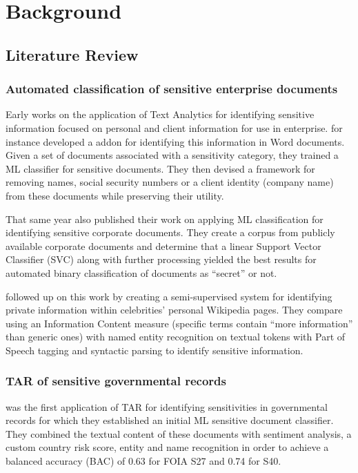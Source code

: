 \documentclass[\version]{l4proj}
\begin{document}
\chapter{Background}

\section{Literature Review}\label{section:lit_review}

\subsection{Automated classification of sensitive enterprise documents}

Early works on the application of Text Analytics for identifying sensitive information focused on personal and client information for use in enterprise.
\textcite{cumbyMachineLearningBased2011} for instance developed a addon for identifying this information in Word documents.
Given a set of documents associated with a sensitivity category, they trained a ML classifier for sensitive documents.
They then devised a framework for removing names, social security numbers or a client identity (company name) from these documents while preserving their utility.

That same year \textcite{hartTextClassificationData2011} also published their work on applying ML classification for identifying sensitive corporate documents.
They create a corpus from publicly available corporate documents and determine that a linear Support Vector Classifier (SVC) along with further processing yielded the best results for automated binary classification of documents as ``secret'' or not.

\textcite{sanchezDetectingSensitiveInformation2012} followed up on this work by creating a semi-supervised system for identifying private information within celebrities' personal Wikipedia pages.
They compare using an Information Content measure (specific terms contain ``more information'' than generic ones) with named entity recognition on textual tokens with Part of Speech tagging and syntactic parsing to identify sensitive information.

\subsection{TAR of sensitive governmental records}

\textcite{mcdonaldClassifierDigitalSensitivity2014} was the first application of TAR for identifying sensitivities in governmental records for which they established an initial ML sensitive document classifier.
They combined the textual content of these documents with sentiment analysis, a custom country risk score, entity and name recognition in order to achieve a balanced accuracy (BAC) of 0.63 for FOIA S27 and 0.74 for S40.
\end{document}
